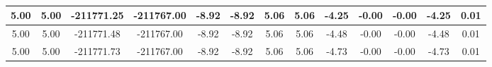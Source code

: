 \begin{table}[htbp]
\begin{adjustbox}{angle=90}
\begin{tabular}{|c|c|c|c|c|c|c|c|c|c|c|c|c|}
 5.00 & 5.00 & -211771.25 & -211767.00 & -8.92 & -8.92 & 5.06 & 5.06 & -4.25 & -0.00 & -0.00 & -4.25 & 0.01\\ \hline
 5.00 & 5.00 & -211771.48 & -211767.00 & -8.92 & -8.92 & 5.06 & 5.06 & -4.48 & -0.00 & -0.00 & -4.48 & 0.01\\ \hline
 5.00 & 5.00 & -211771.73 & -211767.00 & -8.92 & -8.92 & 5.06 & 5.06 & -4.73 & -0.00 & -0.00 & -4.73 & 0.01\\ \hline
            \end{tabular}
        \end{adjustbox}
        \caption{}
        \label{}
    \end{table}
    